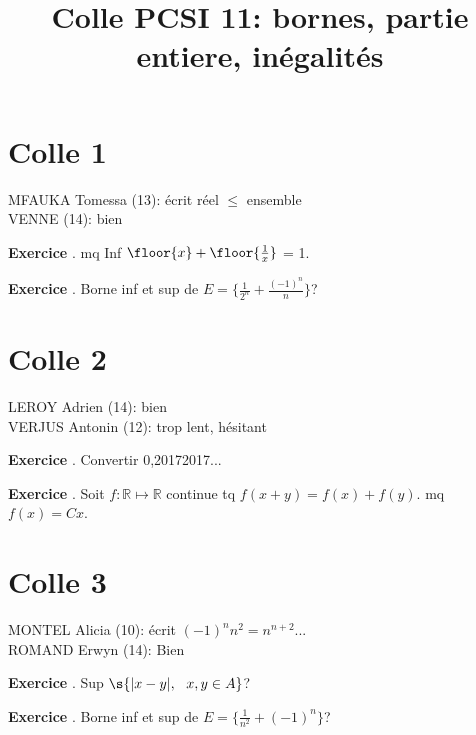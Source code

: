 \documentclass[10pt,a4paper]{article}
\title{Colle PCSI 11: bornes, partie entiere, inégalités}
\newcounter{question}
\newcounter{exo}
\newenvironment{exo}{\vspace{0.5cm}\setcounter{question}{0}\addtocounter{exo}{1} \noindent \textbf{Exercice \theexo}. \normalsize }{\par}
\begin{document}
	\maketitle

	\section*{Colle 1}
	MFAUKA Tomessa (13): écrit réel $\leq$ ensemble\\
	VENNE (14): bien\\
	
	\begin{exo}
		mq Inf $\floor{x} + \floor{\frac{1}{x}}$ = 1.
	\end{exo}
	
	\begin{exo}
		Borne inf et sup de $E = \lbrace \frac{1}{2^n} + \frac{(-1)^n}{n} \rbrace$?
	\end{exo}
	\section*{Colle 2}
	\setcounter{exo}{0}
	LEROY Adrien (14): bien\\
	VERJUS Antonin (12): trop lent, hésitant\\
	
	\begin{exo}
		Convertir 0,20172017...
	\end{exo}

	\begin{exo}
		Soit $f : \mathbb{R} \longmapsto \mathbb{R}$ continue tq $f(x + y) = f(x) + f(y)$.  mq $f(x) = C x$.
	\end{exo}	
	
	
	\section*{Colle 3}
	\setcounter{exo}{0}
	MONTEL Alicia (10): écrit $(-1)^n n^2 = n^{n+2}$...\\
	ROMAND Erwyn (14): Bien\\
	
	\begin{exo}
		Sup $\s{\vert x - y \vert, ~~x, y \in A}$?
	\end{exo}

	\begin{exo}
		Borne inf et sup de $E = \lbrace \frac{1}{n^2} + {(-1)^n} \rbrace$?
	\end{exo}		
\end{document}
